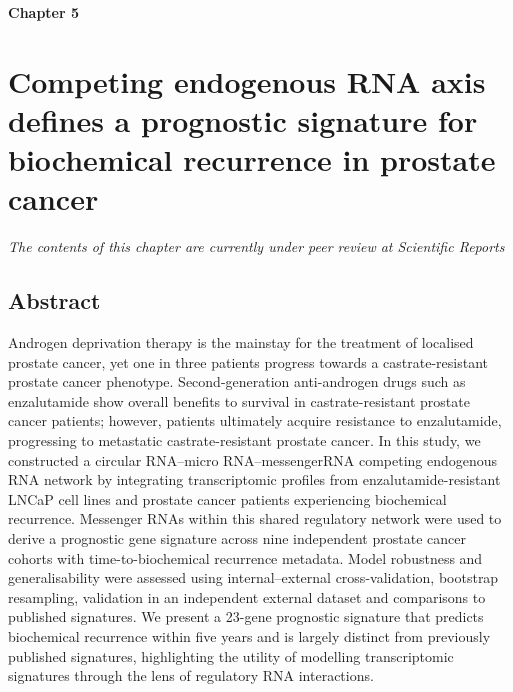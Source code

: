 {\Huge \bfseries \noindent Chapter 5}
\vspace{-1em} 
\section*{\LARGE Competing endogenous RNA axis defines a prognostic signature for biochemical recurrence in prostate cancer}
\setcounter{section}{5}
\setcounter{subsection}{0}  %
\renewcommand{\chapternum}{5}

\renewcommand{\thefigure}{\chapternum.\arabic{figure}}
\setcounter{figure}{0}
\renewcommand{\thetable}{\chapternum.\arabic{table}}
\setcounter{table}{0}


\begin{center}
    \textit{The contents of this chapter are currently under peer review at Scientific Reports}
\end{center}


\subsection*{Abstract}
Androgen deprivation therapy is the mainstay for the treatment of localised prostate cancer, yet one in three patients progress towards a castrate-resistant prostate cancer phenotype. Second-generation anti-androgen drugs such as enzalutamide show overall benefits to survival in castrate-resistant prostate cancer patients; however, patients ultimately acquire resistance to enzalutamide, progressing to metastatic castrate-resistant prostate cancer. In this study, we constructed a circular RNA–micro RNA–messengerRNA competing endogenous RNA network by integrating transcriptomic profiles from enzalutamide-resistant LNCaP cell lines and prostate cancer patients experiencing biochemical recurrence. Messenger RNAs within this shared regulatory network were used to derive a prognostic gene signature across nine independent prostate cancer cohorts with time-to-biochemical recurrence metadata. Model robustness and generalisability were assessed using internal–external cross-validation, bootstrap resampling, validation in an independent external dataset and comparisons to published signatures. We present a 23-gene prognostic signature that predicts biochemical recurrence within five years and is largely distinct from previously published signatures, highlighting the utility of modelling transcriptomic signatures through the lens of regulatory RNA interactions.




